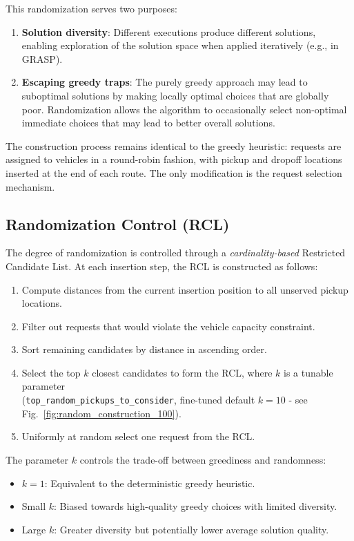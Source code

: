 \documentclass[a4paper]{scrartcl}
\begin{document}
This randomization serves two purposes:
\begin{enumerate}
  \item \textbf{Solution diversity}: Different executions produce different solutions, enabling exploration of the solution space when applied iteratively (e.g., in GRASP).
  \item \textbf{Escaping greedy traps}: The purely greedy approach may lead to suboptimal solutions by making locally optimal choices that are globally poor. Randomization allows the algorithm to occasionally select non-optimal immediate choices that may lead to better overall solutions.
\end{enumerate}

The construction process remains identical to the greedy heuristic: requests are assigned to vehicles in a round-robin fashion, with pickup and dropoff locations inserted at the end of each route. The only modification is the request selection mechanism.

\subsection{Randomization Control (RCL)}
The degree of randomization is controlled through a \emph{cardinality-based} Restricted Candidate List. At each insertion step, the RCL is constructed as follows:

\begin{enumerate}
  \item Compute distances from the current insertion position to all unserved pickup locations.
  \item Filter out requests that would violate the vehicle capacity constraint.
  \item Sort remaining candidates by distance in ascending order.
  \item Select the top $k$ closest candidates to form the RCL, where $k$ is a tunable parameter \\(\texttt{top\_random\_pickups\_to\_consider}, fine-tuned default $k=10$ - see Fig.~\ref{fig:random_construction_100}).
  \item Uniformly at random select one request from the RCL.
\end{enumerate}

The parameter $k$ controls the trade-off between greediness and randomness:
\begin{itemize}
  \item $k = 1$: Equivalent to the deterministic greedy heuristic.
  \item Small $k$: Biased towards high-quality greedy choices with limited diversity.
  \item Large $k$: Greater diversity but potentially lower average solution quality.
\end{itemize}
\end{document}
